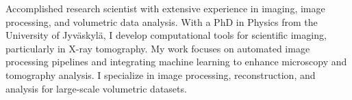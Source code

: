 Accomplished research scientist with extensive experience in imaging, image processing, and volumetric data analysis. With a PhD in Physics from the University of Jyväskylä, I develop computational tools for scientific imaging, particularly in X-ray tomography. My work focuses on automated image processing pipelines and integrating machine learning to enhance microscopy and tomography analysis. I specialize in image processing, reconstruction, and analysis for large-scale volumetric datasets.